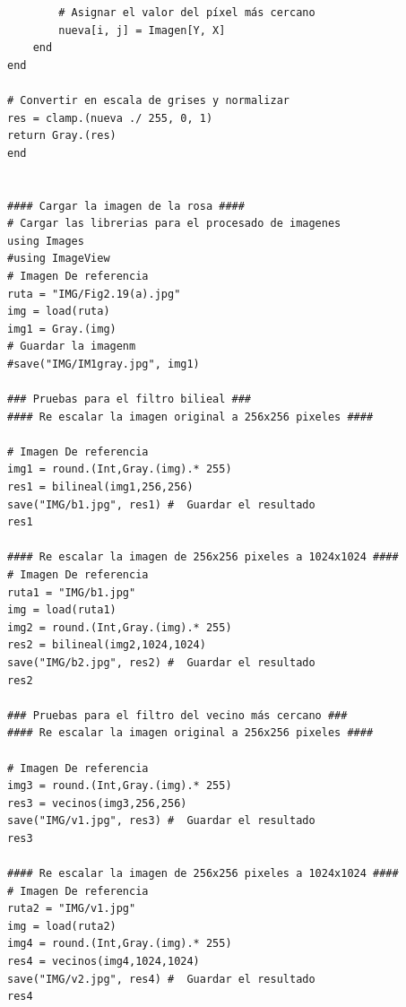 \documentclass[11pt, letterpaper]{article}
\begin{document}
\begin{verbatim}
		# Asignar el valor del píxel más cercano
		nueva[i, j] = Imagen[Y, X]
	end
end

# Convertir en escala de grises y normalizar
res = clamp.(nueva ./ 255, 0, 1)
return Gray.(res)
end


#### Cargar la imagen de la rosa ####
# Cargar las librerias para el procesado de imagenes
using Images
#using ImageView
# Imagen De referencia
ruta = "IMG/Fig2.19(a).jpg"
img = load(ruta)
img1 = Gray.(img)
# Guardar la imagenm
#save("IMG/IM1gray.jpg", img1)

### Pruebas para el filtro bilieal ###
#### Re escalar la imagen original a 256x256 pixeles ####

# Imagen De referencia
img1 = round.(Int,Gray.(img).* 255)
res1 = bilineal(img1,256,256)
save("IMG/b1.jpg", res1) #  Guardar el resultado
res1

#### Re escalar la imagen de 256x256 pixeles a 1024x1024 ####
# Imagen De referencia
ruta1 = "IMG/b1.jpg"
img = load(ruta1)
img2 = round.(Int,Gray.(img).* 255)
res2 = bilineal(img2,1024,1024)
save("IMG/b2.jpg", res2) #  Guardar el resultado
res2

### Pruebas para el filtro del vecino más cercano ###
#### Re escalar la imagen original a 256x256 pixeles ####

# Imagen De referencia
img3 = round.(Int,Gray.(img).* 255)
res3 = vecinos(img3,256,256)
save("IMG/v1.jpg", res3) #  Guardar el resultado
res3

#### Re escalar la imagen de 256x256 pixeles a 1024x1024 ####
# Imagen De referencia
ruta2 = "IMG/v1.jpg"
img = load(ruta2)
img4 = round.(Int,Gray.(img).* 255)
res4 = vecinos(img4,1024,1024)
save("IMG/v2.jpg", res4) #  Guardar el resultado
res4
\end{verbatim}	

	
	
	
	
	
	
	
\end{document}
